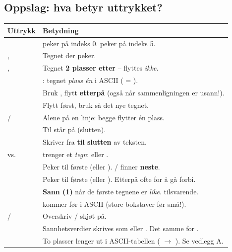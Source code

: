 \subsection{Oppslag: hva betyr uttrykket?}
\begin{center}
\begin{longtable}{@{}L{3.9cm}L{11.7cm}@{}}
\toprule
\textbf{Uttrykk} & \textbf{Betydning} \\
\midrule
\endhead
{} &  peker på indeks 0.  peker på indeks 5. \\
,  & Tegnet der  peker. \\
,  & Tegnet \textbf{2 plasser etter}  --  flyttes \emph{ikke}. \\
 & : tegnet \emph{pluss én} i ASCII ( = ). \\
 & Bruk , flytt  \textbf{etterpå} (også når sammenligningen er usann!). \\
 & Flytt  først, bruk så det nye tegnet. \\
 /  & Alene på en linje: begge flytter  én plass. \\
 & Til  står på  (slutten). \\
 & Skriver fra  \textbf{til slutten} av teksten. \\
 vs.\  &  trenger et \emph{tegn}:  eller . \\
 & Peker til første  (eller ).  /  finner \textbf{neste}. \\
 & Peker til første  (eller ). Etterpå ofte  for å gå forbi. \\
 & \textbf{Sann (1)} når de  første tegnene er \emph{like}.  tilsvarende. \\
 &  kommer før  i ASCII (store bokstaver før små!). \\
 /  & Overskriv / skjøt på. \\
 & Sannhetsverdier skrives som  eller . Det samme for . \\
 & To plasser lenger ut i ASCII-tabellen ( $\rightarrow$ ). Se vedlegg A. \\

\end{longtable}
\end{center}
